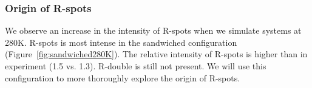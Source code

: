 \documentclass[journal=jpcbfk,manusciprt=article]{achemso}
\begin{document}
%

  \subsubsection{Origin of R-spots}\label{section:rspots}

  We observe an increase in the intensity of R-spots when we simulate systems at 280K. R-spots
  is most intense in the sandwiched configuration (Figure~\ref{fig:sandwiched280K}). The relative 
  intensity of R-spots is higher than in experiment (1.5 vs. 1.3). R-double is still not present.  
  We will use this configuration to more thoroughly explore the origin of R-spots.
  
\end{document}
